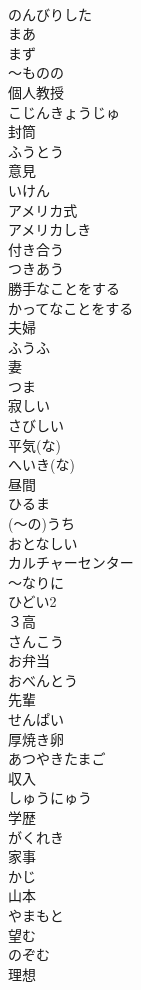 \documentclass[8pt]{extreport}
\begin{document}
\begin{CJK}{UTF8}{min}
\\	のんびりした	
\\	まあ	
\\	まず	
\\	～ものの	
\\	個人教授	
\\	こじんきょうじゅ
\\	封筒	
\\	ふうとう
\\	意見	
\\	いけん
\\	アメリカ式	
\\	アメリカしき
\\	付き合う	
\\	つきあう
\\	勝手なことをする	
\\	かってなことをする
\\	夫婦	
\\	ふうふ
\\	妻	
\\	つま
\\	寂しい	
\\	さびしい
\\	平気(な)	
\\	へいき(な)
\\	昼間	
\\	ひるま
\\	(～の)うち	
\\	おとなしい	
\\	カルチャーセンター	
\\	～なりに	
\\	ひどい2	
\\	３高	
\\	さんこう
\\	お弁当	
\\	おべんとう
\\	先輩	
\\	せんぱい
\\	厚焼き卵	
\\	あつやきたまご
\\	収入	
\\	しゅうにゅう
\\	学歴	
\\	がくれき
\\	家事	
\\	かじ
\\	山本	
\\	やまもと
\\	望む	
\\	のぞむ
\\	理想	

\end{CJK}
\end{document}
